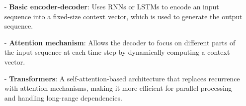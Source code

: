 \documentclass[10pt]{article}
\begin{document}
\begin{itemize}
   \item [-] {\bf Basic encoder-decoder}: Uses RNNs or LSTMs to encode an input sequence into a fixed-size context vector, which is used to generate the output sequence.
   \item [-] {\bf Attention mechanism}: Allows the decoder to focus on different parts of the input sequence at each time step by dynamically computing a context vector.
   \item [-] {\bf Transformers}: A self-attention-based architecture that replaces recurrence with attention mechanisms, making it more efficient for parallel processing and handling long-range dependencies.
\end{itemize}
\end{document}
